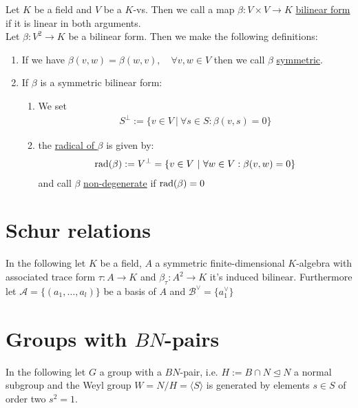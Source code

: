 \documentclass[]{article}
\begin{document}
\begin{definition*}
    Let \(K\) be a field and \(V\) be a \(K\)-vs. Then we call a map \(\beta : V \times V \rightarrow K\) \underline{bilinear form} if it is
    linear in both arguments. \\

    Let \(\beta:V ^2 \rightarrow K\) be a bilinear form. Then we make the following definitions:
    \begin{enumerate}
        \item If we have \(\beta(v,w) = \beta(w,v), \quad \forall v,w \in V\) then we call \(\beta\) \underline{symmetric}. 
        \item If \(\beta\) is a symmetric bilinear form:
            \begin{enumerate}
                \item We set          
                \begin{align*}
                S^\perp := \{ v \in V \ | \ \forall s \in S: \beta(v,s)=0\}
                \end{align*}
                \item the \underline{radical of \(\beta\)} is given by:
                \begin{align*}
                    \operatorname{rad}(\beta):= V^\perp = \{v \in V \ | \ \forall w \in V: \beta(v,w)=0\}
                \end{align*}
                and call \(\beta\) \underline{non-degenerate} if \(\operatorname{rad}(\beta)=0\)
            \end{enumerate}
    \end{enumerate}
\end{definition*}

\section{Schur relations}

In the following let \(K\) be a field, \(A\) a symmetric finite-dimensional \(K\)-algebra with associated trace form \(\tau:A \rightarrow K\) and 
\(\beta_\tau:A^2 \rightarrow K\) it's induced bilinear. Furthermore let \(\mathscr{A}=\{(a_1, \dots, a_l)\}\) be a basis of \(A\) and 
\(\mathscr{B}^\vee = \{a_1^\vee\}\)


\setcounter{section}{1}

\section{Groups with \(BN\)-pairs}
In the following let \(G\) a group with a \(BN\)-pair, i.e. \(H:= B \cap N \trianglelefteq N\) a normal subgroup and the Weyl group 
\(W=N/H=\langle S \rangle\) is generated by elements \(s \in S\) of order two \(s^2=1\). \\
\end{document}
